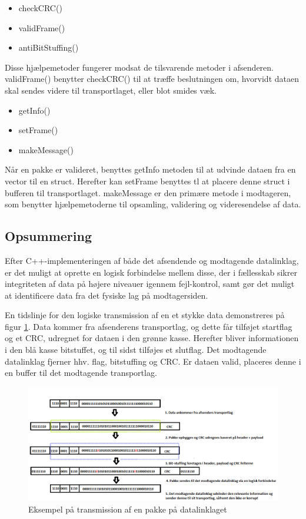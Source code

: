 \begin{itemize}[noitemsep]
  \item checkCRC()
  \item validFrame()
  \item antiBitStuffing()
  \end{itemize}
Disse hjælpemetoder fungerer modsat de tilsvarende metoder i afsenderen. validFrame() benytter checkCRC() til at træffe beslutningen om, hvorvidt dataen skal sendes videre til transportlaget, eller blot smides væk.

\begin{itemize}[noitemsep]
  \item getInfo()
  \item setFrame()
  \item makeMessage()
  \end{itemize}
  
Når en pakke er valideret, benyttes getInfo metoden til at udvinde dataen fra en vector til en struct. Herefter kan setFrame benyttes tl at placere denne struct i bufferen til transportlaget.
makeMessage er den primære metode i modtageren, som benytter hjælpemetoderne til opsamling, validering og videresendelse af data.

\subsection{Opsummering}
Efter C++-implementeringen af både det afsendende og modtagende datalinklag, er det muligt at oprette en logisk forbindelse mellem disse, der i fællesskab sikrer integriteten af data på højere niveauer igennem fejl-kontrol, samt gør det muligt at identificere data fra det fysiske lag på modtagersiden.

En tidslinje for den logiske transmission af en et stykke data demonstreres på figur \ref{fig:DataLinkExample}. Data kommer fra afsenderens transportlag, og dette får tilføjet startflag og et CRC, udregnet for dataen i den grønne kasse. Herefter bliver informationen i den blå kasse bitstuffet, og til sidst tilføjes et slutflag. Det modtagende datalinklag fjerner hhv. flag, bitstuffing og CRC. Er dataen valid, placeres denne i en buffer til det modtagende transportlag.

\begin{figure}[h!]
\centering
\includegraphics[scale=0.6]{Billeder/DataLinkExample.PNG}
\caption{Eksempel på transmission af en pakke på datalinklaget}
\label{fig:DataLinkExample}
\end{figure}